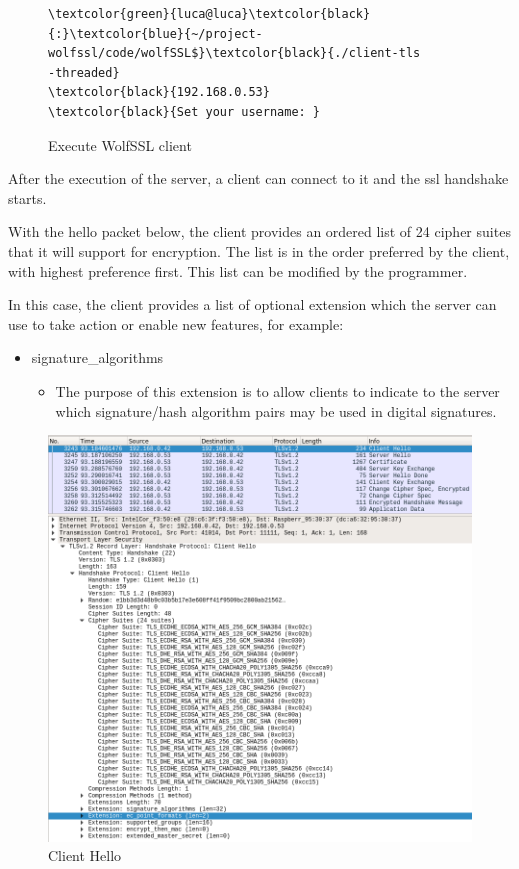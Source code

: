\documentclass[a4paper,12pt]{article}
\begin{document}
\begin{figure}[H]
\begin{Verbatim}[commandchars=\\\{\}]
\textcolor{green}{luca@luca}\textcolor{black}{:}\textcolor{blue}{~/project-wolfssl/code/wolfSSL$}\textcolor{black}{./client-tls
-threaded}
\textcolor{black}{192.168.0.53}
\textcolor{black}{Set your username: }
\end{Verbatim}
\caption{Execute WolfSSL client}
\end{figure}

After the execution of the server, a client can connect to it and the ssl handshake starts.

With the hello packet below, the client provides an ordered list of 24 cipher suites that it will support for encryption. The list is in the order preferred by the client, with highest preference first. This list can be modified by the programmer.

In this case, the client provides a list of optional extension which the server can use to take action or enable new features, for example:
\begin{itemize}
\item signature\_algorithms
\begin{itemize}
\item The purpose of this extension is to allow clients to indicate to the server which signature/hash algorithm pairs may be used in digital signatures.
\end{itemize}
\end{itemize}
\begin{figure}[H]
    \centering
    \includegraphics[scale=0.500]{./code/img/client-hello.png}
    \caption{Client Hello}
\end{figure}
\end{document}

